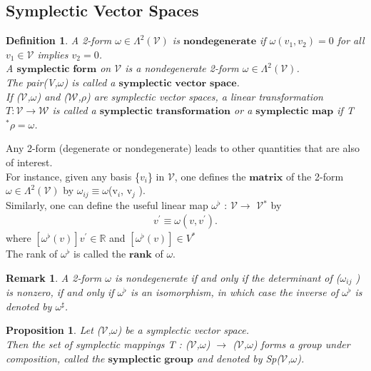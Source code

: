 \documentclass[12pt,a4paper]{article}
\newtheorem{rem}[thm]{Remark}
\newtheorem{defn}[thm]{Definition}
\newtheorem{prop}{Proposition}
\begin{document}
\subsection{Symplectic Vector Spaces}

\begin{defn}
A 2-form $\omega \in \Lambda^{2}(\mathcal{V})$ is $\textbf{nondegenerate}$ if $\omega(v_1, v_2) = 0$ for all $v_1 \in \mathcal{V}$ implies $v_2 = 0$. \\
A $\textbf{symplectic form}$ on $\mathcal{V}$ is a nondegenerate 2-form $\omega \in \Lambda^{2}(\mathcal{V})$. 
\\The pair(V,$\omega$) is called a $\textbf{symplectic vector space}$.\\
If ($\mathcal{V}$,$\omega$) and ($\mathcal{W}$,$\rho$) are symplectic vector spaces, a linear transformation $T:\mathcal{V} \to \mathcal{W}$ is called a $\textbf{symplectic transformation}$ or a $\textbf{symplectic map}$ if T$^* \rho = \omega$.
\end{defn}

Any 2-form (degenerate or nondegenerate) leads to other quantities that
are also of interest. \\
For instance, given any basis \{$v_i$\} in $\mathcal{V}$, one defines the
$\textbf{matrix}$ of the 2-form $\omega \in \Lambda^{2}(\mathcal{V})$ by $\omega_{ij} \equiv \omega$(v$_i$, v$_j$ ). \\Similarly, one can
define the useful linear map $\omega^{\flat}$ : $\mathcal{V}$$\to$ $\mathcal{V}$$^*$ by
\begin{align*}
 [ \omega^{\flat} (v) ] v^{'} \equiv \omega(v, v^{'}).
\end{align*}
 where $ [ \omega^{\flat} (v) ] v^{'} \in \mathbb{R}$ and  $ [ \omega^{\flat} (v) ] \in V^{*}$\\
The rank of $\omega^{\flat}$ is called the $\textbf{rank}$ of $\omega$.
\begin{rem}
A 2-form $\omega$ is nondegenerate if and only if the determinant of ($\omega_{ij}$ ) is nonzero, if and only if $\omega^{\flat}$ is an isomorphism, in which
case the inverse of $\omega^{\flat}$ is denoted by $\omega^{\sharp}$.
\end{rem}
\begin{prop}
Let ($\mathcal{V}$,$\omega$) be a symplectic vector space. \\Then the set of
symplectic mappings T : ($\mathcal{V}$,$\omega$) $\to$ ($\mathcal{V}$,$\omega$) forms a group under composition,
called the $\textbf{symplectic group}$ and denoted by Sp($\mathcal{V}$,$\omega$).
\end{prop}
\end{document}
